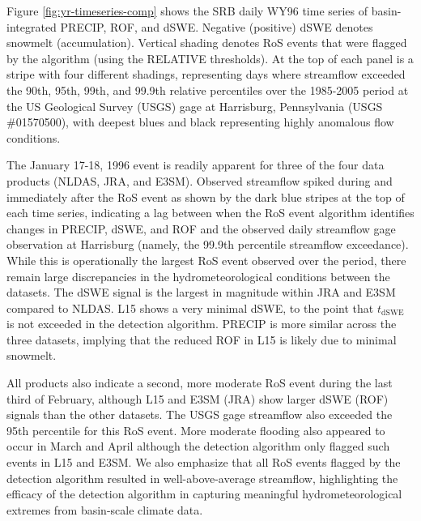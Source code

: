 \documentclass[nhess, manuscript]{copernicus}
\begin{document}
Figure \ref{fig:yr-timeseries-comp} shows the SRB daily WY96 time series of basin-integrated PRECIP, ROF, and dSWE.
Negative (positive) dSWE denotes snowmelt (accumulation).
Vertical shading denotes RoS events that were flagged by the algorithm (using the RELATIVE thresholds).
At the top of each panel is a stripe with four different shadings, representing days where streamflow exceeded the 90th, 95th, 99th, and 99.9th relative percentiles over the 1985-2005 period at the US Geological Survey (USGS) gage at Harrisburg, Pennsylvania (USGS \#01570500), with deepest blues and black representing highly anomalous flow conditions.

The January 17-18, 1996 event is readily apparent for three of the four data products (NLDAS, JRA, and E3SM).
Observed streamflow spiked during and immediately after the RoS event as shown by the dark blue stripes at the top of each time series, indicating a lag between when the RoS event algorithm identifies changes in PRECIP, dSWE, and ROF and the observed daily streamflow gage observation at Harrisburg (namely, the 99.9th percentile streamflow exceedance).
While this is operationally the largest RoS event observed over the period, there remain large discrepancies in the hydrometeorological conditions between the datasets.
The dSWE signal is the largest in magnitude within JRA and E3SM compared to NLDAS.
L15 shows a very minimal dSWE, to the point that $t_{\textrm{dSWE}}$ is not exceeded in the detection algorithm.
PRECIP is more similar across the three datasets, implying that the reduced ROF in L15 is likely due to minimal snowmelt.

All products also indicate a second, more moderate RoS event during the last third of February, although L15 and E3SM (JRA) show larger dSWE (ROF) signals than the other datasets.
The USGS gage streamflow also exceeded the 95th percentile for this RoS event.
More moderate flooding also appeared to occur in March and April although the detection algorithm only flagged such events in L15 and E3SM.
We also emphasize that all RoS events flagged by the detection algorithm resulted in well-above-average streamflow, highlighting the efficacy of the detection algorithm in capturing meaningful hydrometeorological extremes from basin-scale climate data.
\end{document}
